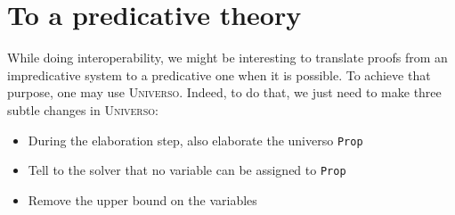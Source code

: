 \documentclass[conference]{IEEEtran}
\newcommand{\universo}{\textsc{Universo}}
\begin{document}





\section{To a predicative theory}

While doing interoperability, we might be interesting to translate proofs from an impredicative system to a predicative one when it is possible. To achieve that purpose, one may use \universo. Indeed, to do that, we just need to make three subtle changes in \universo:
\begin{itemize}
\item During the elaboration step, also elaborate the universo \texttt{Prop}
\item Tell to the solver that no variable can be assigned to \texttt{Prop}
\item Remove the upper bound on the variables
\end{itemize}
\end{document}
